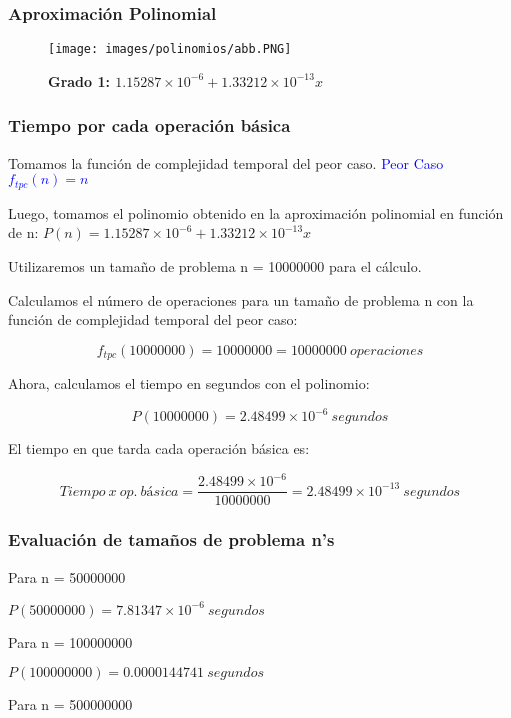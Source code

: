 \documentclass[12pt]{article}
\begin{document}
			\subsubsection{Aproximación Polinomial}
    			\begin{figure}[H]
    			  \centering
    			 \texttt{[image: images/polinomios/abb.PNG]}
    			    	   \caption*{\textbf{Grado 1: $1.15287\times10^{-6} + 1.33212\times10^{-13} x$}}
    			  \end{figure}


			\subsubsection{Tiempo por cada operación básica}
			    Tomamos la función de complejidad temporal del peor caso. \textcolor{blue}{ Peor Caso $f_{tpc}(n) = n$}
			
    			Luego, tomamos el polinomio obtenido en la aproximación polinomial en función de n: $P(n) = 1.15287\times10^{-6} + 1.33212\times10^{-13} x$
    			
    			Utilizaremos un tamaño de problema n = 10000000 para el cálculo.
    			
    			Calculamos el número de operaciones para un tamaño de problema n con la función de complejidad temporal del peor caso:
    			
    			$$f_{tpc}(10000000) = 10000000 = 10000000 ~operaciones$$
    			
    			Ahora, calculamos el tiempo en segundos con el polinomio:
    			
    			$$P(10000000) = 2.48499\times10^{-6}~ segundos$$
    			
    			El tiempo en que tarda cada operación básica es:
    			
    			$$Tiempo~x~op.~básica = \frac{2.48499\times10^{-6}}{10000000} = 2.48499\times10^{-13}~segundos$$
\newpage
			\subsubsection{Evaluación de tamaños de problema n's}
    			Para n = 50000000
    			
                $P(50000000) = 7.81347\times10^{-6}~ segundos$
    
    			Para n = 100000000
    			
    			$P(100000000) = 0.0000144741~ segundos$
    			
    			Para n = 500000000
    			
\end{document}
